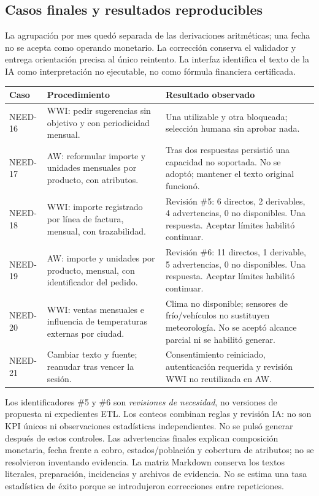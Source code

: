 \documentclass[10pt,letterpaper]{article}
\begin{document}
\subsection{Casos finales y resultados reproducibles}
La agrupación por mes quedó separada de las derivaciones aritméticas; una fecha
no se acepta como operando monetario. La corrección conserva el validador y entrega
orientación precisa al único reintento. La interfaz identifica el texto de la IA
como interpretación no ejecutable, no como fórmula financiera certificada.

\small
\begin{longtable}{@{}p{}p{}p{}@{}}
\toprule Caso & Procedimiento & Resultado observado\\\midrule\endhead
NEED-16 & WWI: pedir sugerencias sin objetivo y con periodicidad mensual. & Una utilizable y otra bloqueada; selección humana sin aprobar nada.\\
NEED-17 & AW: reformular importe y unidades mensuales por producto, con atributos. & Tras dos respuestas persistió una capacidad no soportada. No se adoptó; mantener el texto original funcionó.\\
NEED-18 & WWI: importe registrado por línea de factura, mensual, con trazabilidad. & Revisión \#5: 6 directos, 2 derivables, 4 advertencias, 0 no disponibles. Una respuesta. Aceptar límites habilitó continuar.\\
NEED-19 & AW: importe y unidades por producto, mensual, con identificador del pedido. & Revisión \#6: 11 directos, 1 derivable, 5 advertencias, 0 no disponibles. Una respuesta. Aceptar límites habilitó continuar.\\
NEED-20 & WWI: ventas mensuales e influencia de temperaturas externas por ciudad. & Clima no disponible; sensores de frío/vehículos no sustituyen meteorología. No se aceptó alcance parcial ni se habilitó generar.\\
NEED-21 & Cambiar texto y fuente; reanudar tras vencer la sesión. & Consentimiento reiniciado, autenticación requerida y revisión WWI no reutilizada en AW.\\
\bottomrule\end{longtable}
\normalsize

Los identificadores \#5 y \#6 son \emph{revisiones de necesidad}, no versiones de
propuesta ni expedientes ETL. Los conteos combinan reglas y revisión IA: no son
KPI únicos ni observaciones estadísticas independientes.
No se pulsó generar después de estos controles. Las
advertencias finales explican composición monetaria, fecha frente a cobro,
estados/población y cobertura de atributos; no se resolvieron inventando evidencia.
La matriz Markdown conserva los textos literales, preparación, incidencias y
archivos de evidencia. No se estima una tasa estadística de éxito porque se
introdujeron correcciones entre repeticiones.
\end{document}
